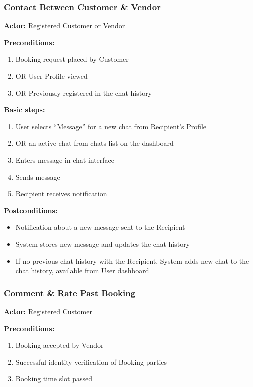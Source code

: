 \documentclass[11pt,a4paper]{article}
\begin{document}
\subsubsection{Contact Between Customer \& Vendor}

\textbf{Actor:} Registered Customer or Vendor

\noindent \textbf{Preconditions:}
\begin{enumerate}
  \item Booking request placed by Customer
  \item OR User Profile viewed
  \item OR Previously registered in the chat history
\end{enumerate}

\noindent \textbf{Basic steps:}
\begin{enumerate}
  \item User selects ``Message'' for a new chat from Recipient's Profile
  \item OR an active chat from chats list on the dashboard
  \item Enters message in chat interface
  \item Sends message
  \item Recipient receives notification
\end{enumerate}

\noindent \textbf{Postconditions:}
\begin{itemize}
  \item Notification about a new message sent to the Recipient
  \item System stores new message and updates the chat history
  \item If no previous chat history with the Recipient, System adds
    new chat to the chat history, available from User dashboard
\end{itemize}

\subsubsection{Comment \& Rate Past Booking }

\textbf{Actor:} Registered Customer

\noindent \textbf{Preconditions:}
\begin{enumerate}
  \item Booking accepted by Vendor
  \item Successful identity verification of Booking parties
  \item Booking time slot passed
\end{enumerate}
\end{document}

